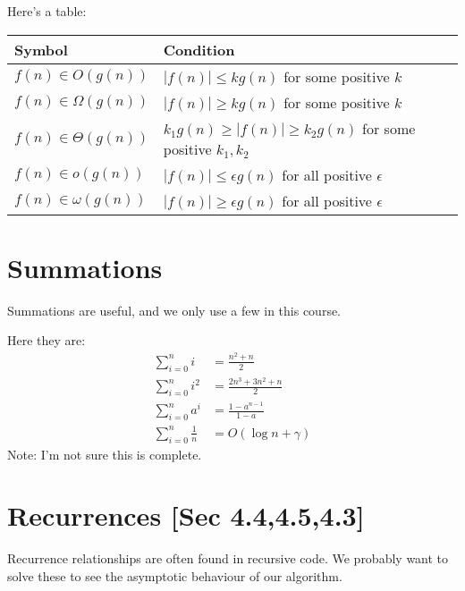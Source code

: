             Here's a table:
            \begin{table}[h]
                \centering
                \begin{tabular}{ | l || l |}
                    \hline
                    Symbol & Condition \\ \hline
                    $f(n) \in O(g(n))$       & $|f(n)| \le k g(n)$ for some positive $k$ \\ \hline
                    $f(n) \in \Omega(g(n))$  & $|f(n)| \ge k g(n)$ for some positive $k$ \\ \hline
                    $f(n) \in \Theta(g(n))$  & $k_1 g(n) \ge |f(n)| \ge k_2 g(n)$ for some positive $k_1, k_2$ \\ \hline
                    $f(n) \in o(g(n))$       & $|f(n)| \le \epsilon g(n) $ for all positive $\epsilon$ \\ \hline
                    $f(n) \in \omega (g(n))$ & $|f(n)| \ge \epsilon g(n) $ for all positive $\epsilon$ \\ \hline
                \end{tabular}
            \end{table}

    \section{Summations}
        Summations are useful, and we only use a few in this course.

        Here they are:
        \begin{align*}
            \sum_{i=0}^n i &= \frac{n^2 + n}{2} \\
            \sum_{i=0}^n i^2 &= \frac{2n^3 + 3n^2 + n}{2} \\
            \sum_{i=0}^n a^i &= \frac{1 - a^{n-1}}{1-a} \\
            \sum_{i=0}^n \frac{1}{n} &= O(\log n + \gamma)
        \end{align*}
        Note: I'm not sure this is complete.

    \section{Recurrences [Sec 4.4,4.5,4.3]}
        Recurrence relationships are often found in recursive code. We probably
        want to solve these to see the asymptotic behaviour of our algorithm.

